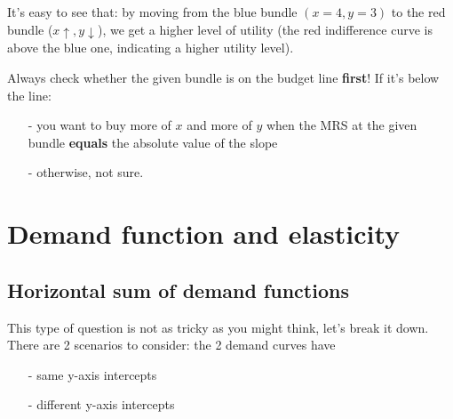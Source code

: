 \documentclass[twoside]{article}
\let\bar\overline
\theoremstyle{definition}
\begin{document}
\begin{center}
\end{center}

It's easy to see that: by moving from the blue bundle $(x=4,y=3)$ to the red bundle ($x\uparrow,y\downarrow$), we get a higher level of utility (the red indifference curve is above the blue one, indicating a higher utility level).

 Always check whether the given bundle is on the budget line \textbf{first}! If it's below the line:
\begin{itemize}
    \item[-] you want to buy more of $x$ and more of $y$ when the MRS at the given bundle \textbf{equals} the absolute value of the slope
    \item[-] otherwise, not sure.
\end{itemize}

\section{Demand function and elasticity}
\subsection{Horizontal sum of demand functions}
This type of question is not as tricky as you might think, let's break it down. There are 2 scenarios to consider: the 2 demand curves have 
\begin{itemize}
    \item[-] same y-axis intercepts
    \item[-] different y-axis intercepts
\end{itemize}
\end{document}
